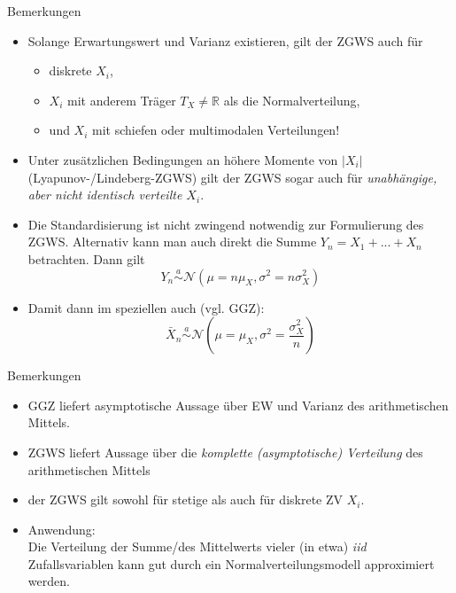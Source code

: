 \documentclass[
  10pt,
  ignorenonframetext,
]{beamer}
\providecommand{\tightlist}{%
  \setlength{\itemsep}{0pt}\setlength{\parskip}{0pt}}
\begin{document}
\begin{frame}{Bemerkungen}
\protect\hypertarget{bemerkungen-1}{}
\begin{itemize}
\item
  Solange Erwartungswert und Varianz existieren, gilt der ZGWS auch für

  \begin{itemize}
  \tightlist
  \item
    diskrete \(X_i\),
  \item
    \(X_i\) mit anderem Träger \(T_X \neq \mathbb R\) als die
    Normalverteilung,
  \item
    und \(X_i\) mit schiefen oder multimodalen Verteilungen!
  \end{itemize}
\item
  Unter zusätzlichen Bedingungen an höhere Momente von \(|X_i|\)
  (Lyapunov-/Lindeberg-ZGWS) gilt der ZGWS sogar auch für
  \emph{unabhängige, aber nicht identisch verteilte \(X_i\)}.
\item
  Die Standardisierung ist nicht zwingend notwendig zur Formulierung des
  ZGWS. Alternativ kann man auch direkt die Summe
  \(Y_n = X_1 + ... + X_n\) betrachten. Dann gilt \[
  Y_n \stackrel{a}{\sim} {\mathcal N}(\mu = n\mu_X, \sigma^2 = n\sigma_X^2)
  \]
\item
  Damit dann im speziellen auch (vgl. GGZ):
  \[\bar X_n  \stackrel{a}{\sim} {\mathcal N}\left(\mu = \mu_X, \sigma^2 = \frac{\sigma_X^2}{n}\right)\]
\end{itemize}
\end{frame}

\begin{frame}{Bemerkungen}
\protect\hypertarget{bemerkungen-2}{}
\begin{itemize}
\item
  GGZ liefert asymptotische Aussage über EW und Varianz des
  arithmetischen Mittels.
\item
  ZGWS liefert Aussage über die \emph{komplette (asymptotische)
  Verteilung} des arithmetischen Mittels
\item
  der ZGWS gilt sowohl für stetige als auch für diskrete ZV \(X_i\).
\item
  Anwendung:\\
  Die Verteilung der Summe/des Mittelwerts vieler (in etwa) \emph{iid}
  Zufallsvariablen kann gut durch ein Normalverteilungsmodell
  approximiert werden.
\end{itemize}
\end{frame}
\end{document}
